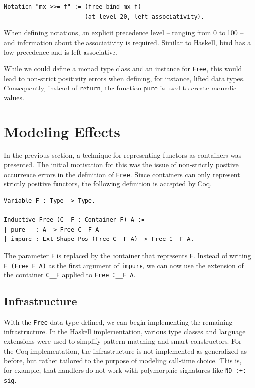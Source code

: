 \documentclass[a4paper, 11pt, fleqn, twoside, abstract=on]{scrreprt}
\newcommand{\hinl}[1]{\texttt{#1}}
\newcommand{\cinl}[1]{\texttt{#1}}
\begin{document}
\begin{verbatim}
Notation "mx >>= f" := (free_bind mx f)
                       (at level 20, left associativity).
\end{verbatim}

When defining notations, an explicit precedence level -- ranging from 0 to 100 -- and information about the associativity is required.
Similar to Haskell, bind has a low precedence and is left associative.

While we could define a monad type class and an instance for \cinl{Free}, this would lead to non-strict positivity errors when defining, for instance, lifted data types.
Consequently, instead of \hinl{return}, the function \cinl{pure} is used to create monadic values.

\section{Modeling Effects}

In the previous section, a technique for representing functors as containers was presented.
The initial motivation for this was the issue of non-strictly positive occurrence errors in the definition of \cinl{Free}.
Since containers can only represent strictly positive functors, the following definition is accepted by Coq.

\begin{verbatim}
Variable F : Type -> Type.

Inductive Free (C__F : Container F) A :=
| pure   : A -> Free C__F A
| impure : Ext Shape Pos (Free C__F A) -> Free C__F A.
\end{verbatim}

The parameter \cinl{F} is replaced by the container that represents \cinl{F}.
Instead of writing \cinl{F (Free F A)} as the first argument of \cinl{impure}, we can now use the extension of the container \cinl{C__F} applied to \cinl{Free C__F A}.

\subsection{Infrastructure}
\label{subsec:infrastructure}

With the \cinl{Free} data type defined, we can begin implementing the remaining infrastructure. 
In the Haskell implementation, various type classes and language extensions were used to simplify pattern matching and smart constructors.
For the Coq implementation, the infrastructure is not implemented as generalized as before, but rather tailored to the purpose of modeling call-time choice.
This is, for example, that handlers do not work with polymorphic signatures like \cinl{ND :+: sig}.
\end{document}
